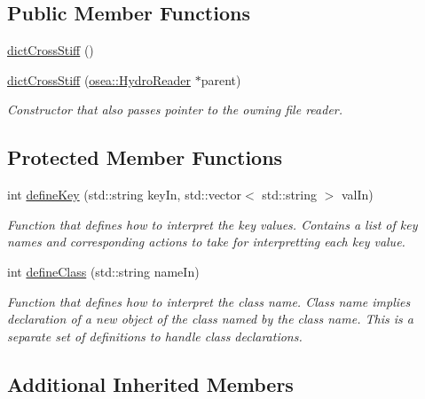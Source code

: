 \subsection*{Public Member Functions}
\begin{DoxyCompactItemize}
\item 
\hyperlink{classosea_1_1dict_cross_stiff_a7ebc4603f64868e2c4c29723c00da235}{dict\-Cross\-Stiff} ()
\item 
\hyperlink{classosea_1_1dict_cross_stiff_aa5ac0c6e52534cf3ce69a85f93e6b1a8}{dict\-Cross\-Stiff} (\hyperlink{classosea_1_1_hydro_reader}{osea\-::\-Hydro\-Reader} $\ast$parent)
\begin{DoxyCompactList}\small\item\em Constructor that also passes pointer to the owning file reader. \end{DoxyCompactList}\end{DoxyCompactItemize}
\subsection*{Protected Member Functions}
\begin{DoxyCompactItemize}
\item 
int \hyperlink{classosea_1_1dict_cross_stiff_a02d47d0e4a6f3bc4370d8d020414ba88}{define\-Key} (std\-::string key\-In, std\-::vector$<$ std\-::string $>$ val\-In)
\begin{DoxyCompactList}\small\item\em Function that defines how to interpret the key values. Contains a list of key names and corresponding actions to take for interpretting each key value. \end{DoxyCompactList}\item 
int \hyperlink{classosea_1_1dict_cross_stiff_aa18b99fc24d83d531ba473035b790c1b}{define\-Class} (std\-::string name\-In)
\begin{DoxyCompactList}\small\item\em Function that defines how to interpret the class name. Class name implies declaration of a new object of the class named by the class name. This is a separate set of definitions to handle class declarations. \end{DoxyCompactList}\end{DoxyCompactItemize}
\subsection*{Additional Inherited Members}


